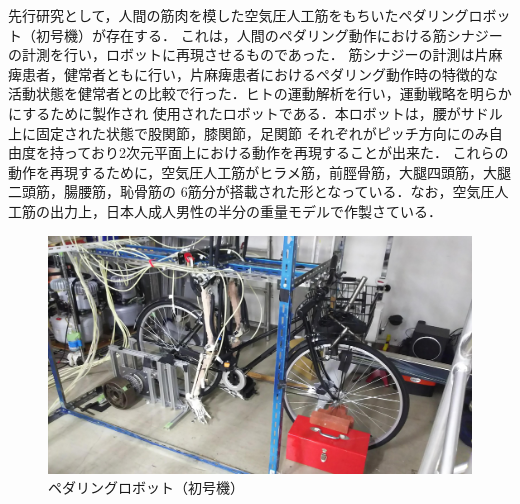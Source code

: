 先行研究として，人間の筋肉を模した空気圧人工筋をもちいたペダリングロボット（初号機）が存在する．
これは，人間のペダリング動作における筋シナジーの計測を行い，ロボットに再現させるものであった．
筋シナジーの計測は片麻痺患者，健常者ともに行い，片麻痺患者におけるペダリング動作時の特徴的な
活動状態を健常者との比較で行った．ヒトの運動解析を行い，運動戦略を明らかにするために製作され
使用されたロボットである．本ロボットは，腰がサドル上に固定された状態で股関節，膝関節，足関節
それぞれがピッチ方向にのみ自由度を持っており2次元平面上における動作を再現することが出来た．
これらの動作を再現するために，空気圧人工筋がヒラメ筋，前脛骨筋，大腿四頭筋，大腿二頭筋，腸腰筋，恥骨筋の
6筋分が搭載された形となっている．なお，空気圧人工筋の出力上，日本人成人男性の半分の重量モデルで作製さている．%
\begin{figure}[h]
 \begin{center}
  \includegraphics[width=0.75\columnwidth,clip]{Photo/BackGround/1st.eps}
  \caption{ペダリングロボット（初号機）}
  \label{初号機}
  \end{center} %
\end{figure}

\newpage

